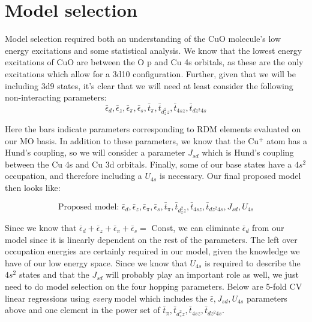 \documentclass{article}
\begin{document}
\section{Model selection}
Model selection required both an understanding of the CuO molecule's low energy excitations and some statistical analysis. We know that the lowest energy excitations of CuO are between the O p and Cu 4s orbitals, as these are the only excitations which allow for a 3d10 configuration. Further, given that we will be including 3d9 states, it's clear that we will need at least consider the following non-interacting parameters:
$$\bar{\epsilon}_d, \bar{\epsilon}_z, \bar{\epsilon}_\pi, \bar{\epsilon}_s, \bar{t}_\pi, \bar{t}_{d_z^2 z}, \bar{t}_{4s z}, \bar{t}_{dz^2 4s}$$

Here the bars indicate parameters corresponding to RDM elements evaluated on our MO basis. In addition to these parameters, we know that the Cu$^+$ atom has a Hund's coupling, so we will consider a parameter $J_{sd}$ which is Hund's coupling between the Cu 4s and Cu 3d orbitals. Finally, some of our base states have a $4s^2$ occupation, and therefore including a $U_{4s}$ is necessary. Our final proposed model then looks like: 

$$ \boxed{\text{Proposed model: }\bar{\epsilon}_d, \bar{\epsilon}_z, \bar{\epsilon}_\pi, \bar{\epsilon}_s, \bar{t}_\pi, \bar{t}_{d_z^2 z}, \bar{t}_{4s z}, \bar{t}_{dz^2 4s}, J_{sd}, U_{4s}}$$

Since we know that $\bar{\epsilon}_d + \bar{\epsilon}_z + \bar{\epsilon}_\pi + \bar{\epsilon}_s = $ Const, we can eliminate $\bar{\epsilon}_d$ from our model since it is linearly dependent on the rest of the parameters. The left over occupation energies are certainly required in our model, given the knowledge we have of our low energy space. Since we know that $U_{4s}$ is required to describe the $4s^2$ states and that the $J_{sd}$ will probably play an important role as well, we just need to do model selection on the four hopping parameters. Below are 5-fold CV linear regressions using \textit{every} model which includes the $\bar{\epsilon}, J_{sd}, U_{4s}$ parameters above and one element in the power set of $\bar{t}_\pi, \bar{t}_{d_z^2 z}, \bar{t}_{4s z}, \bar{t}_{dz^2 4s}$. 
\end{document}
